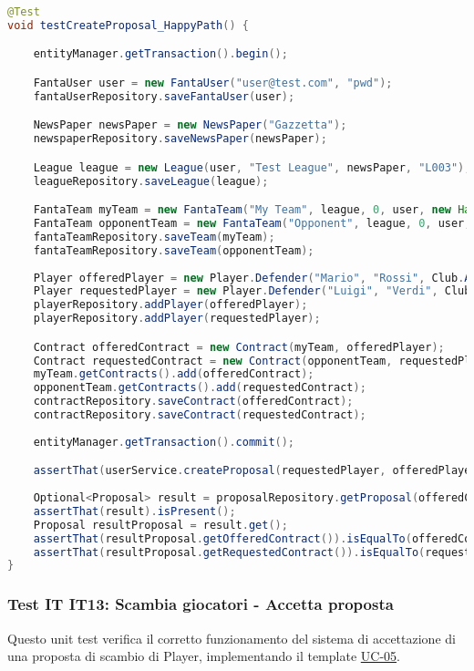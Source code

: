 \begin{lstlisting}[language=Java]
@Test
void testCreateProposal_HappyPath() {

	entityManager.getTransaction().begin();

	FantaUser user = new FantaUser("user@test.com", "pwd");
	fantaUserRepository.saveFantaUser(user);

	NewsPaper newsPaper = new NewsPaper("Gazzetta");
	newspaperRepository.saveNewsPaper(newsPaper);

	League league = new League(user, "Test League", newsPaper, "L003");
	leagueRepository.saveLeague(league);

    FantaTeam myTeam = new FantaTeam("My Team", league, 0, user, new HashSet<>());
    FantaTeam opponentTeam = new FantaTeam("Opponent", league, 0, user, new HashSet<>());
	fantaTeamRepository.saveTeam(myTeam);
	fantaTeamRepository.saveTeam(opponentTeam);
		
	Player offeredPlayer = new Player.Defender("Mario", "Rossi", Club.ATALANTA);
	Player requestedPlayer = new Player.Defender("Luigi", "Verdi", Club.BOLOGNA);
	playerRepository.addPlayer(offeredPlayer);
	playerRepository.addPlayer(requestedPlayer);

	Contract offeredContract = new Contract(myTeam, offeredPlayer);
	Contract requestedContract = new Contract(opponentTeam, requestedPlayer);
	myTeam.getContracts().add(offeredContract);
	opponentTeam.getContracts().add(requestedContract);
	contractRepository.saveContract(offeredContract);
	contractRepository.saveContract(requestedContract);
		
	entityManager.getTransaction().commit();

	assertThat(userService.createProposal(requestedPlayer, offeredPlayer, myTeam, opponentTeam)).isTrue();
		
	Optional<Proposal> result = proposalRepository.getProposal(offeredContract, requestedContract);
	assertThat(result).isPresent();
	Proposal resultProposal = result.get();
	assertThat(resultProposal.getOfferedContract()).isEqualTo(offeredContract);
	assertThat(resultProposal.getRequestedContract()).isEqualTo(requestedContract);
}
\end{lstlisting}


\subsubsection{Test IT IT13: Scambia giocatori - Accetta proposta} \label{IT13}

Questo unit test verifica il corretto funzionamento del sistema di accettazione di una proposta di scambio di Player,
implementando il template \hyperref[UC-05]{UC-05}.

